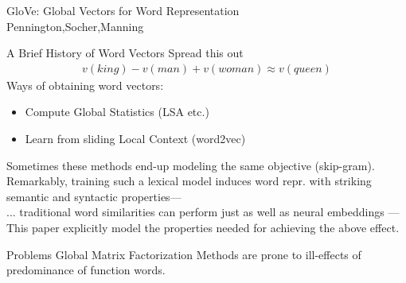 \begin{frame}
  \begin{center}
    {\huge GloVe: Global Vectors for Word Representation
    } \\
    Pennington,Socher,Manning
  \end{center}
\end{frame}

\begin{frame}{A Brief History of Word Vectors}
  Spread this out
  \begin{align*}
    v(king) - v(man) + v(woman) \approx v(queen)
  \end{align*}
  Ways of obtaining word vectors:
  \begin{itemize}
  \item Compute Global Statistics (LSA etc.) %
  \item Learn from sliding Local Context (word2vec) %
  \end{itemize}
  Sometimes these methods end-up modeling the same objective (skip-gram).
  {\footnotesize Remarkably, training such a lexical model induces word repr. with striking semantic and syntactic properties---\cite{Mikolov13a}} \\
  {\footnotesize ... traditional word similarities can perform just as well as neural embeddings ---\cite{Levy14}} \\
  This paper explicitly model the properties needed for achieving the above effect.
\end{frame}

\begin{frame}{Problems}
  Global Matrix Factorization Methods are prone to ill-effects of predominance of function words.
\end{frame}

